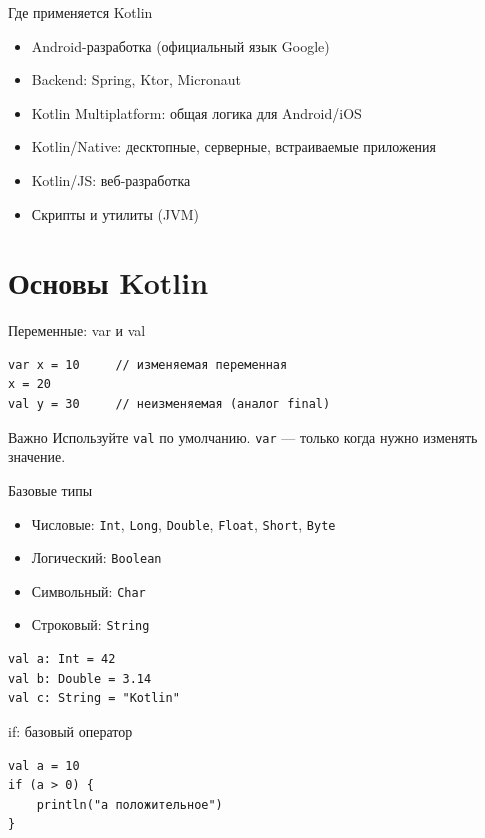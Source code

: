 \documentclass[aspectratio=169]{beamer}
\begin{document}
\begin{frame}{Где применяется Kotlin}
\begin{itemize}
  \item Android-разработка (официальный язык Google)
  \item Backend: Spring, Ktor, Micronaut
  \item Kotlin Multiplatform: общая логика для Android/iOS
  \item Kotlin/Native: десктопные, серверные, встраиваемые приложения
  \item Kotlin/JS: веб-разработка
  \item Скрипты и утилиты (JVM)
\end{itemize}
\end{frame}

\section{Основы Kotlin}

\begin{frame}[fragile]{Переменные: var и val}
\lstset{language=Kotlin}
\begin{lstlisting}
var x = 10     // изменяемая переменная
x = 20
val y = 30     // неизменяемая (аналог final)
\end{lstlisting}
\begin{block}{Важно}
Используйте \texttt{val} по умолчанию.  
\texttt{var} — только когда нужно изменять значение.
\end{block}
\end{frame}

\begin{frame}[fragile]{Базовые типы}
\begin{itemize}
  \item Числовые: \texttt{Int}, \texttt{Long}, \texttt{Double}, \texttt{Float}, \texttt{Short}, \texttt{Byte}
  \item Логический: \texttt{Boolean}
  \item Символьный: \texttt{Char}
  \item Строковый: \texttt{String}
\end{itemize}
\lstset{language=Kotlin}
\begin{lstlisting}
val a: Int = 42
val b: Double = 3.14
val c: String = "Kotlin"
\end{lstlisting}
\end{frame}

\begin{frame}[fragile]{if: базовый оператор}
\lstset{language=Kotlin}
\begin{lstlisting}
val a = 10
if (a > 0) {
    println("a положительное")
}
\end{lstlisting}
\end{frame}
\end{document}
